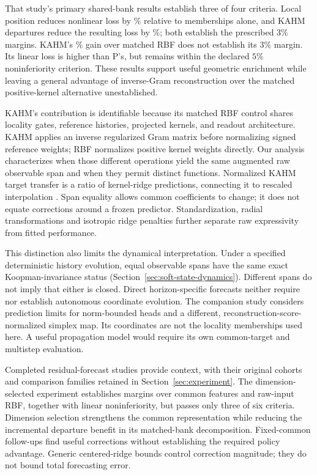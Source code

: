 That study's primary shared-bank results establish three of four criteria.
Local position reduces nonlinear loss by \SAGainPG\% relative to
memberships alone, and KAHM departures reduce the resulting loss by
\SAGainKP\%; both establish the prescribed $3\%$ margins. KAHM's
\SAGainKR\% gain over matched RBF does not establish its $3\%$ margin.
Its linear loss is higher than P's, but remains within the declared
$5\%$ noninferiority criterion. These results support useful geometric
enrichment while leaving a general advantage of inverse-Gram
reconstruction over the matched positive-kernel alternative unestablished.

KAHM's contribution is identifiable because its matched RBF control
shares locality gates, reference histories, projected kernels, and
readout architecture. KAHM applies an inverse regularized Gram matrix
before normalizing signed reference weights; RBF normalizes positive
kernel weights directly. Our analysis characterizes when those
different operations yield the same augmented raw observable span
and when they permit distinct functions. Normalized KAHM target
transfer is a ratio of kernel-ridge predictions, connecting it to
rescaled interpolation \citep{Deparis2014Rescaled,DeMarchi2017Rescaled}.
Span equality allows common coefficients to change; it does not
equate corrections around a frozen predictor. Standardization,
radial transformations and isotropic ridge penalties further separate
raw expressivity from fitted performance.

This distinction also limits the dynamical interpretation. Under a
specified deterministic history evolution, equal observable spans
have the same exact Koopman-invariance status
(Section~\ref{sec:soft-state-dynamics}). Different spans do not imply
that either is closed. Direct horizon-specific forecasts neither
require nor establish autonomous coordinate evolution. The companion
study \citep{KumarKargaran2026Limits} considers prediction limits for
norm-bounded heads and a different, reconstruction-score-normalized
simplex map. Its coordinates are not the locality memberships used
here. A useful propagation model would require its own common-target
and multistep evaluation.

Completed residual-forecast studies provide context, with their original
cohorts and comparison families retained in
Section~\ref{sec:experiment}. The dimension-selected experiment
establishes margins over common features and raw-input RBF, together
with linear noninferiority, but passes only three of six criteria.
Dimension selection strengthens the common representation while reducing
the incremental departure benefit in its matched-bank decomposition.
Fixed-common follow-ups find useful corrections without establishing
the required policy advantage. Generic centered-ridge bounds control
correction magnitude; they do not bound total forecasting error.

